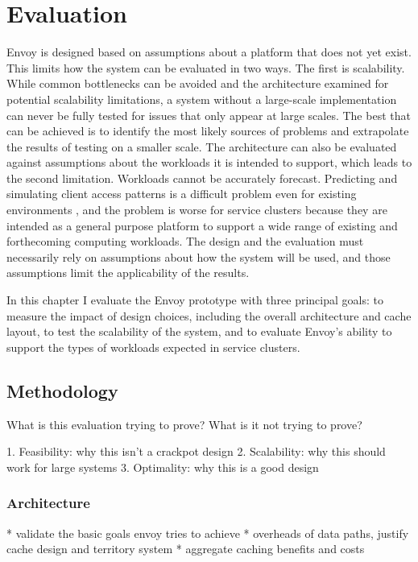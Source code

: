 \chapter{Evaluation}\label{cha:evaluation}

Envoy is designed based on assumptions about a platform that does not yet exist. This limits how the system can be evaluated in two ways. The first is scalability. While common bottlenecks can be avoided and the architecture examined for potential scalability limitations, a system without a large-scale implementation can never be fully tested for issues that only appear at large scales. The best that can be achieved is to identify the most likely sources of problems and extrapolate the results of testing on a smaller scale. The architecture can also be evaluated against assumptions about the workloads it is intended to support, which leads to the second limitation. Workloads cannot be accurately forecast. Predicting and simulating client access patterns is a difficult problem even for existing environments \cite{ganger95}, and the problem is worse for service clusters because they are intended as a general purpose platform to support a wide range of existing and forthecoming computing workloads. The design and the evaluation must necessarily rely on assumptions about how the system will be used, and those assumptions limit the applicability of the results.

In this chapter I evaluate the Envoy prototype with three principal goals: to measure the impact of design choices, including the overall architecture and cache layout, to test the scalability of the system, and to evaluate Envoy's ability to support the types of workloads expected in service clusters.

\section{Methodology}

What is this evaluation trying to prove?  What is it not trying to prove?

1. Feasibility: why this isn't a crackpot design
2. Scalability: why this should work for large systems
3. Optimality: why this is a good design

\subsection{Architecture}
* validate the basic goals envoy tries to achieve
* overheads of data paths, justify cache design and territory system
* aggregate caching benefits and costs

